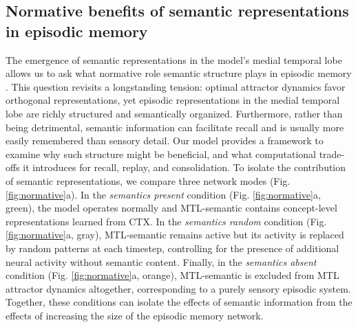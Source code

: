 \documentclass{article}
\begin{document}
\subsection*{Normative benefits of semantic representations in episodic memory}
The emergence of semantic representations in the model’s medial temporal lobe allows us to ask what normative role semantic structure plays in episodic memory . This question revisits a longstanding tension: optimal attractor dynamics favor orthogonal representations, yet episodic representations in the medial temporal lobe are richly structured and semantically organized. Furthermore, rather than being detrimental, semantic information can facilitate recall and is usually more easily remembered than sensory detail. Our model provides a framework to examine why such structure might be beneficial, and what computational trade-offs it introduces for recall, replay, and consolidation.
\newline\newline
To isolate the contribution of semantic representations, we compare three network modes (Fig. \ref{fig:normative}a). In the \textit{semantics present} condition (Fig. \ref{fig:normative}a, green), the model operates normally and MTL-semantic contains concept-level representations learned from CTX. In the \textit{semantics random} condition (Fig. \ref{fig:normative}a, gray), MTL-semantic remains active but its activity is replaced by random patterns at each timestep, controlling for the presence of additional neural activity without semantic content. Finally, in the \textit{semantics absent} condition (Fig. \ref{fig:normative}a, orange), MTL-semantic is excluded from MTL attractor dynamics altogether, corresponding to a purely sensory episodic system. Together, these conditions can isolate the effects of semantic information from the effects of increasing the size of the episodic memory network.
\end{document}
